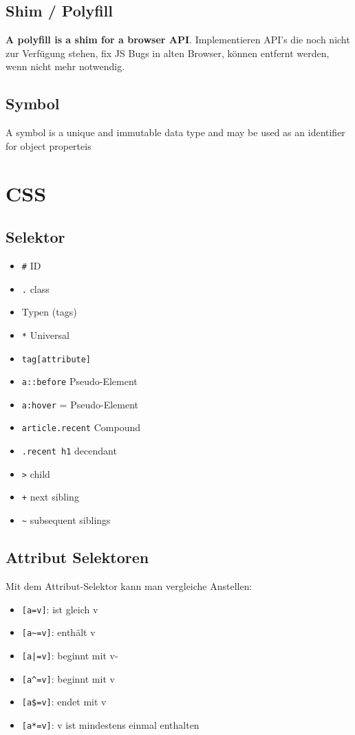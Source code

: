 \documentclass[11pt,twoside,landscape]{article}
\begin{document}
\begin{multicols}{4}
\subsection{Shim / Polyfill}
\label{sec:org88e160c}
\textbf{A polyfill is a shim for a browser API}. Implementieren API's die noch nicht zur Verfügung stehen, fix JS Bugs in alten Browser, können entfernt werden, wenn nicht mehr notwendig.

\subsection{Symbol}
\label{sec:org0eeecc9}
A symbol is a unique and immutable data type and may be used as an identifier for object properteis

\section{CSS}
\label{sec:org88484d6}
\subsection{Selektor}
\label{sec:orge0322db}
\begin{itemize}
\item \texttt{\#} ID
\item \texttt{.} class
\item Typen (tags)
\item \texttt{*} Universal
\item \texttt{tag[attribute]}
\item \texttt{a::before} Pseudo-Element
\item \texttt{a:hover} = Pseudo-Element
\item \texttt{article.recent} Compound
\item \texttt{.recent h1} decendant
\item \texttt{>} child
\item \texttt{+} next sibling
\item \texttt{\textasciitilde{}} subsequent siblings
\end{itemize}


\subsection{Attribut Selektoren}
\label{sec:org0b3d309}
Mit dem Attribut-Selektor kann man vergleiche Anstellen:
\begin{itemize}
\item \texttt{[a=v]}: ist gleich v
\item \texttt{[a\textasciitilde{}=v]}: enthält v
\item \texttt{[a|=v]}: beginnt mit v-
\item \texttt{[a\textasciicircum{}=v]}: beginnt mit v
\item \texttt{[a\$=v]}: endet mit v
\item \texttt{[a*=v]}: v ist mindestens einmal enthalten
\end{itemize}



\end{multicols}
\end{document}
